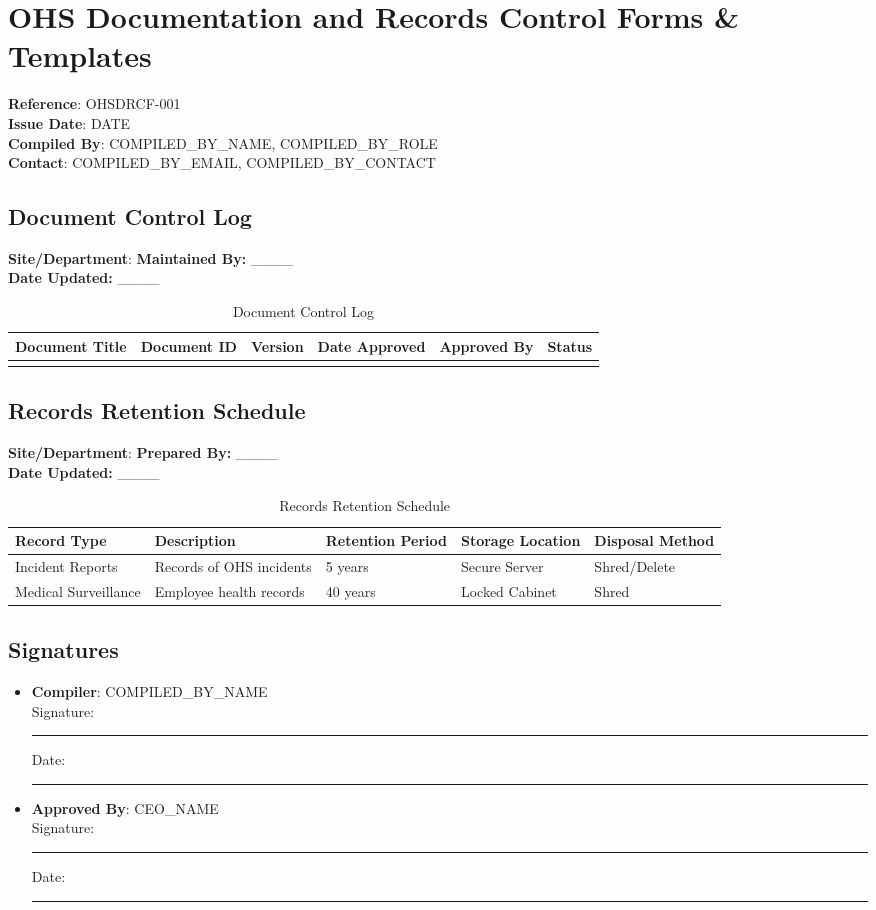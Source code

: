 \documentclass[11pt]{article}
\newcommand{\docTitle}{OHS Documentation and Records Control Forms \& Templates}
\newcommand{\refNumber}{OHSDRCF-001}
\newcommand{\issueDate}{{{DATE}}}
\newcommand{\location}{}
\newcommand{\compilerName}{{{COMPILED_BY_NAME}}}
\newcommand{\compilerRole}{{{COMPILED_BY_ROLE}}}
\newcommand{\compilerEmail}{{{COMPILED_BY_EMAIL}}}
\newcommand{\compilerPhone}{{{COMPILED_BY_CONTACT}}}
\begin{document}
\section*{\docTitle}
\textbf{Reference}: \refNumber \\
\textbf{Issue Date}: \issueDate \\
\textbf{Compiled By}: \compilerName, \compilerRole \\
\textbf{Contact}: \compilerEmail, \compilerPhone

\subsection*{Document Control Log}

\textbf{Site/Department}: \location \textbf{Maintained By:} \_\_\_\_ \\
\textbf{Date Updated:} \_\_\_\_

\begin{table}[h]
    \centering
    \begin{tabular}{p{2cm}p{3cm}p{2cm}p{2cm}p{2cm}p{2cm}}
        \toprule
        \textbf{Document Title} & \textbf{Document ID} & \textbf{Version} & \textbf{Date Approved} & \textbf{Approved By} & \textbf{Status} \\
        \midrule
        & & & & & \\
        \bottomrule
    \end{tabular}
    \caption{Document Control Log}
\end{table}

\subsection*{Records Retention Schedule}

\textbf{Site/Department}: \location \textbf{Prepared By:} \_\_\_\_ \\
\textbf{Date Updated:} \_\_\_\_

\begin{table}[h]
    \centering
    \begin{tabular}{p{3cm}p{3cm}p{2cm}p{2cm}p{3cm}}
        \toprule
        \textbf{Record Type} & \textbf{Description} & \textbf{Retention Period} & \textbf{Storage Location} & \textbf{Disposal Method} \\
        \midrule
        Incident Reports & Records of OHS incidents & 5 years & Secure Server & Shred/Delete \\
        Medical Surveillance & Employee health records & 40 years & Locked Cabinet & Shred \\
        \bottomrule
    \end{tabular}
    \caption{Records Retention Schedule}
\end{table}

\subsection*{Signatures}
\begin{itemize}
  \item \textbf{Compiler}: \compilerName \\
    Signature: \rule{5cm}{0.4pt} \quad Date: \rule{3cm}{0.4pt}
  \item \textbf{Approved By}: {{CEO_NAME}} \\
    Signature: \rule{5cm}{0.4pt} \quad Date: \rule{3cm}{0.4pt}
\end{itemize}
\end{document}
